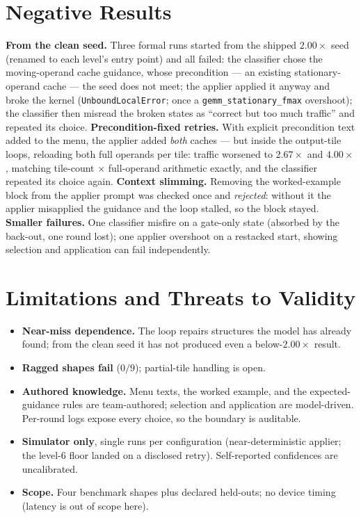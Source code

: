 \documentclass[10pt]{article}
\begin{document}
\section{Negative Results}
\textbf{From the clean seed.} Three formal runs started from the shipped $2.00\times$ seed
(renamed to each level's entry point) and all failed: the classifier chose the moving-operand
cache guidance, whose precondition --- an existing stationary-operand cache --- the seed does not
meet; the applier applied it anyway and broke the kernel (\texttt{UnboundLocalError}; once a
\texttt{gemm\_stationary\_fmax} overshoot); the classifier then misread the broken states as
``correct but too much traffic'' and repeated its choice. \textbf{Precondition-fixed retries.}
With explicit precondition text added to the menu, the applier added \emph{both} caches --- but
inside the output-tile loops, reloading both full operands per tile: traffic worsened to
$2.67\times$ and $4.00\times$, matching tile-count $\times$ full-operand arithmetic exactly, and
the classifier repeated its choice again. \textbf{Context slimming.} Removing the worked-example
block from the applier prompt was checked once and \emph{rejected}: without it the applier
misapplied the guidance and the loop stalled, so the block stayed. \textbf{Smaller failures.} One
classifier misfire on a gate-only state (absorbed by the back-out, one round lost); one applier
overshoot on a restacked start, showing selection and application can fail independently.

\section{Limitations and Threats to Validity}
\begin{itemize}[leftmargin=1.4em,itemsep=1pt,topsep=2pt]
  \item \textbf{Near-miss dependence.} The loop repairs structures the model has already found;
        from the clean seed it has not produced even a below-$2.00\times$ result.
  \item \textbf{Ragged shapes fail} ($0/9$); partial-tile handling is open.
  \item \textbf{Authored knowledge.} Menu texts, the worked example, and the expected-guidance
        rules are team-authored; selection and application are model-driven. Per-round logs expose
        every choice, so the boundary is auditable.
  \item \textbf{Simulator only}, single runs per configuration (near-deterministic applier; the
        level-6 floor landed on a disclosed retry). Self-reported confidences are uncalibrated.
  \item \textbf{Scope.} Four benchmark shapes plus declared held-outs; no device timing
        (latency is out of scope here).
\end{itemize}
\end{document}
